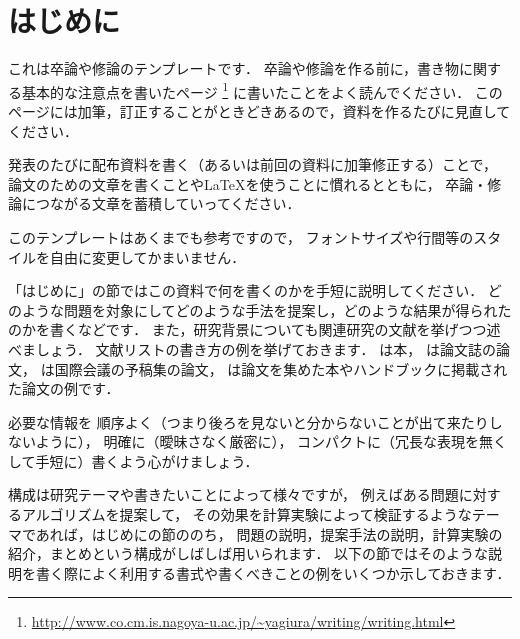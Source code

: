\chapter{はじめに}
これは卒論や修論のテンプレートです．
卒論や修論を作る前に，書き物に関する基本的な注意点を書いたページ
\footnote{\url{http://www.co.cm.is.nagoya-u.ac.jp/~yagiura/writing/writing.html}}
に書いたことをよく読んでください．
このページには加筆，訂正することがときどきあるので，資料を作るたびに見直してください．

発表のたびに配布資料を書く（あるいは前回の資料に加筆修正する）ことで，
論文のための文章を書くことや\LaTeX を使うことに慣れるとともに，
卒論・修論につながる文章を蓄積していってください．

このテンプレートはあくまでも参考ですので，
フォントサイズや行間等のスタイルを自由に変更してかまいません．

「はじめに」の節ではこの資料で何を書くのかを手短に説明してください．
どのような問題を対象にしてどのような手法を提案し，どのような結果が得られたのかを書くなどです．
また，研究背景についても関連研究の文献を挙げつつ述べましょう．
文献リストの書き方の例を挙げておきます．
\cite{GareyJohnson79}は本，
\cite{MHI13,YIG04}は論文誌の論文，
\cite{IYI05}は国際会議の予稿集の論文，
\cite{JohnsonMcGeoch97}は論文を集めた本やハンドブックに掲載された論文の例です．

必要な情報を
順序よく（つまり後ろを見ないと分からないことが出て来たりしないように），
明確に（曖昧さなく厳密に），
コンパクトに（冗長な表現を無くして手短に）書くよう心がけましょう．


構成は研究テーマや書きたいことによって様々ですが，
例えばある問題に対するアルゴリズムを提案して，
その効果を計算実験によって検証するようなテーマであれば，はじめにの節ののち，
問題の説明，提案手法の説明，計算実験の紹介，まとめという構成がしばしば用いられます．
以下の節ではそのような説明を書く際によく利用する書式や書くべきことの例をいくつか示しておきます．